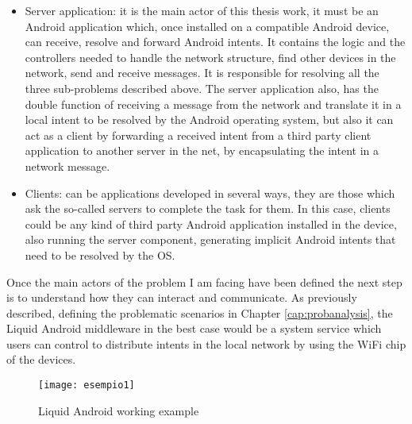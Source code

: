 \begin{itemize}
	\item Server application: it is the main actor of this thesis work, it must be an Android application which, once installed on a compatible Android device, can receive, resolve and forward Android intents. It contains the logic and the controllers needed to handle the network structure, find other devices in the network, send and receive messages. It is responsible for resolving all the three sub-problems described above. The server application also, has the double function of receiving a message from the network and translate it in a local intent to be resolved by the Android operating system, but also it can act as a client by forwarding a received intent from a third party client application to another server in the net, by encapsulating the intent in a network message.
	\item Clients: can be applications developed in several ways, they are those which ask the so-called servers to complete the task for them. In this case, clients could be any kind of third party Android application installed in the device, also running the server component, generating implicit Android intents that need to be resolved by the OS. 
\end{itemize}
Once the main actors of the problem I am facing have been defined the next step is to understand how they can interact and communicate. As previously described, defining the problematic scenarios in Chapter \ref{cap:probanalysis}, the Liquid Android middleware in the best case would be a system service which users can control to distribute intents in the local network by using the WiFi chip of the devices.
\begin{figure}[h]
	\centering
	\texttt{[image: esempio1]}
	\caption{Liquid Android working example}
	\label{fig:4.2}
\end{figure}
